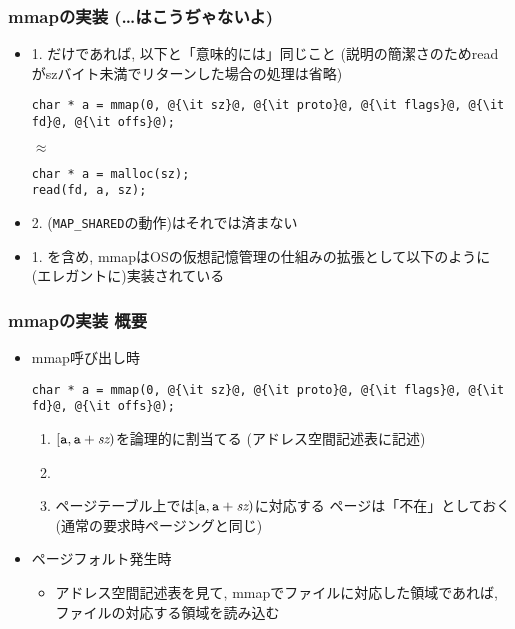 \documentclass[12pt,dvipdfmx]{beamer}
\begin{document}
\begin{frame}[fragile]
  \frametitle{mmapの実装 (\ldots はこうぢゃないよ)}
  \begin{itemize}
  \item 1. だけであれば, 以下と「意味的には」同じこと
    (説明の簡潔さのためreadがszバイト未満でリターンした場合の処理は省略)
\begin{lstlisting}
char * a = mmap(0, @{\it sz}@, @{\it proto}@, @{\it flags}@, @{\it fd}@, @{\it offs}@);
\end{lstlisting}
$\approx$
\begin{lstlisting}
char * a = malloc(sz);
read(fd, a, sz);
\end{lstlisting}
\item 2. ({\tt MAP\_SHARED}の動作)はそれでは済まない
\item 1. を含め, mmapはOSの仮想記憶管理の仕組みの拡張として以下のように
  (エレガントに)実装されている
\end{itemize}
\end{frame}

\begin{frame}[fragile]
  \frametitle{mmapの実装 概要}
  \begin{itemize}
  \item mmap呼び出し時
\begin{lstlisting}
char * a = mmap(0, @{\it sz}@, @{\it proto}@, @{\it flags}@, @{\it fd}@, @{\it offs}@);
\end{lstlisting}
\begin{enumerate}
\item $[\mbox{\tt a}, \mbox{\tt a} + \mbox{\it sz})$を論理的に割当てる
  (アドレス空間記述表に記述)
\item {}
\item ページテーブル上では$[\mbox{\tt a}, \mbox{\tt a} + \mbox{\it sz})$に対応する
  ページは「不在」としておく(通常の要求時ページングと同じ)
\end{enumerate}
\item ページフォルト発生時
  \begin{itemize}
  \item アドレス空間記述表を見て, mmapでファイルに対応した領域であれば,
    ファイルの対応する領域を読み込む
  \end{itemize}
\end{itemize}
\end{frame}
\end{document}
